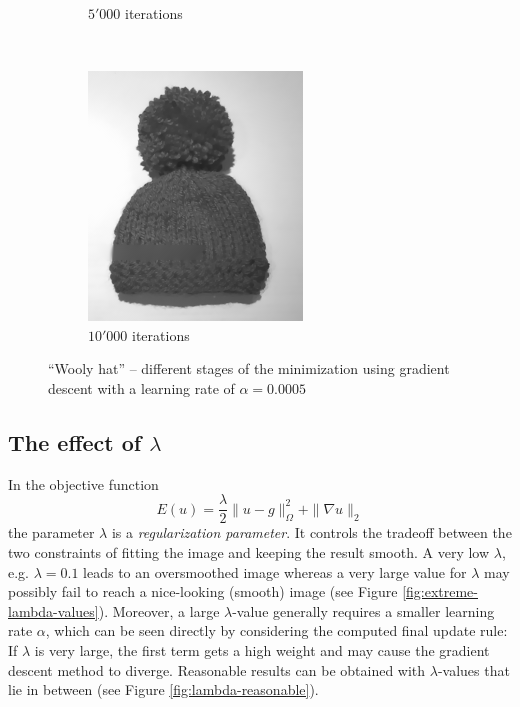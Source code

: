 \documentclass{paper}
\begin{document}
\begin{figure}[ht]
\begin{subfigure}[ht]{0.3\textwidth}
	\caption*{$5'000$ iterations}
\end{subfigure}
~
\begin{subfigure}[ht]{0.3\textwidth}
	\centering
	\includegraphics[width=\textwidth]{hat-iter10000-lambda100-alpha0_001}
	\caption*{$10'000$ iterations}
\end{subfigure}
\caption{``Wooly hat'' -- different stages of the minimization using gradient descent with a learning rate of $\alpha = 0.0005$}
\label{fig:results-hat}
\end{figure}

\subsection*{The effect of $\lambda$}
In the objective function
$$E(u) = \frac{\lambda}{2} \|u-g\|_\Omega^2 + \|\nabla u \|_2$$
the parameter $\lambda$ is a \emph{regularization parameter}. It controls the tradeoff between the two constraints of fitting the image and keeping the result smooth. A very low $\lambda$, e.g. $\lambda = 0.1$ leads to an oversmoothed image whereas a very large value for $\lambda$ may possibly fail to reach a nice-looking (smooth) image (see Figure \ref{fig:extreme-lambda-values}). Moreover, a large $\lambda$-value generally requires a smaller learning rate $\alpha$, which can be seen directly by considering the computed final update rule: If $\lambda$ is very large, the first term gets a high weight and may cause the gradient descent method to diverge. Reasonable results can be obtained with $\lambda$-values that lie in between (see Figure \ref{fig:lambda-reasonable}).
\end{document}
